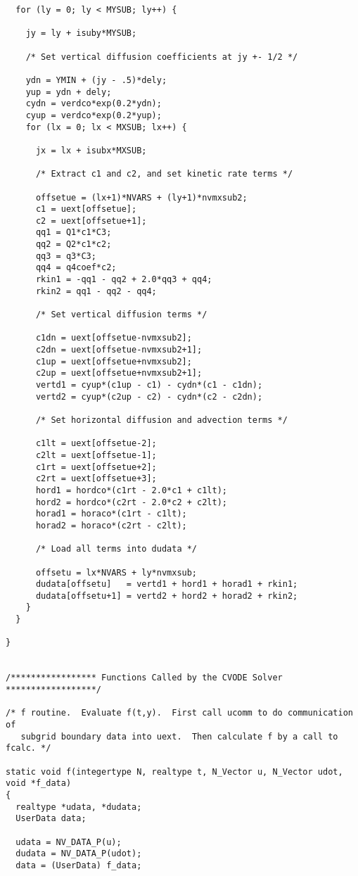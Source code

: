 \begin{verbatim}
  for (ly = 0; ly < MYSUB; ly++) {

    jy = ly + isuby*MYSUB;

    /* Set vertical diffusion coefficients at jy +- 1/2 */

    ydn = YMIN + (jy - .5)*dely;
    yup = ydn + dely;
    cydn = verdco*exp(0.2*ydn);
    cyup = verdco*exp(0.2*yup);
    for (lx = 0; lx < MXSUB; lx++) {

      jx = lx + isubx*MXSUB;

      /* Extract c1 and c2, and set kinetic rate terms */

      offsetue = (lx+1)*NVARS + (ly+1)*nvmxsub2;
      c1 = uext[offsetue];
      c2 = uext[offsetue+1];
      qq1 = Q1*c1*C3;
      qq2 = Q2*c1*c2;
      qq3 = q3*C3;
      qq4 = q4coef*c2;
      rkin1 = -qq1 - qq2 + 2.0*qq3 + qq4;
      rkin2 = qq1 - qq2 - qq4;

      /* Set vertical diffusion terms */

      c1dn = uext[offsetue-nvmxsub2];
      c2dn = uext[offsetue-nvmxsub2+1];
      c1up = uext[offsetue+nvmxsub2];
      c2up = uext[offsetue+nvmxsub2+1];
      vertd1 = cyup*(c1up - c1) - cydn*(c1 - c1dn);
      vertd2 = cyup*(c2up - c2) - cydn*(c2 - c2dn);

      /* Set horizontal diffusion and advection terms */

      c1lt = uext[offsetue-2];
      c2lt = uext[offsetue-1];
      c1rt = uext[offsetue+2];
      c2rt = uext[offsetue+3];
      hord1 = hordco*(c1rt - 2.0*c1 + c1lt);
      hord2 = hordco*(c2rt - 2.0*c2 + c2lt);
      horad1 = horaco*(c1rt - c1lt);
      horad2 = horaco*(c2rt - c2lt);

      /* Load all terms into dudata */

      offsetu = lx*NVARS + ly*nvmxsub;
      dudata[offsetu]   = vertd1 + hord1 + horad1 + rkin1; 
      dudata[offsetu+1] = vertd2 + hord2 + horad2 + rkin2;
    }
  }

}


/***************** Functions Called by the CVODE Solver ******************/

/* f routine.  Evaluate f(t,y).  First call ucomm to do communication of 
   subgrid boundary data into uext.  Then calculate f by a call to fcalc. */

static void f(integertype N, realtype t, N_Vector u, N_Vector udot, void *f_data)
{
  realtype *udata, *dudata;
  UserData data;

  udata = NV_DATA_P(u);
  dudata = NV_DATA_P(udot);
  data = (UserData) f_data;



\end{verbatim}
